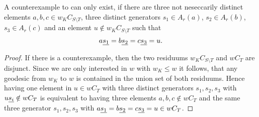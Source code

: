 \begin{lemm}
\label{counterexample-simplification2}
A counterexample to  can only exist, if there are three not
neseccarily distinct elements $a,b,c \in w_K C_{S \setminus T}$, three
distinct generators $s_1 \in A_r(a)$, $s_2 \in A_r(b)$, $s_3 \in A_r(c)$ and an
element $u \notin w_K C_{S \setminus T}$ such that
$$ a \underline{s_1} = b \underline{s_2} = c \underline{s_3} = u. $$

\begin{proof}
If there is a counterexample, then the two residuums $w_K C_{S \setminus T}$ and
$w C_T$ are disjunct. Since we are only interested in $w$ with $w_K \leq w$
it follows, that any geodesic from $w_K$ to $w$ is contained in the union set
of both residuums. Hence having one element in $u \in w C_T$ with three distinct
generators $s_1,s_2,s_3$ with $u \underline{s_i} \notin w C_T$ is equivalent to having
three elements $a,b,c \notin w C_T$ and the same three generator $s_1,s_2,s_3$
with $a \underline{s_1} = b \underline{s_2} = c \underline{s_3} = u \in w C_T$.
\end{proof}
\end{lemm}
